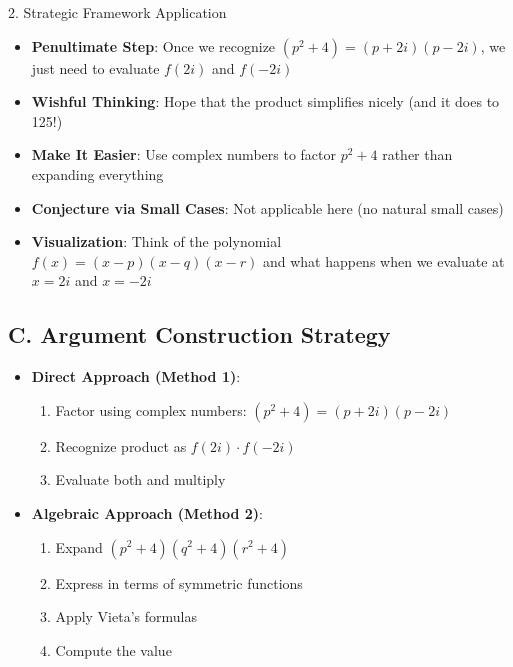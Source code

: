 \documentclass[12pt]{article}
\begin{document}
\begin{strategybox}{2. Strategic Framework Application}
\begin{itemize}[leftmargin=*]
    \item \textbf{Penultimate Step}: Once we recognize $(p^2 + 4) = (p + 2i)(p - 2i)$, we just need to evaluate $f(2i)$ and $f(-2i)$
    
    \item \textbf{Wishful Thinking}: Hope that the product simplifies nicely (and it does to 125!)
    
    \item \textbf{Make It Easier}: Use complex numbers to factor $p^2 + 4$ rather than expanding everything
    
    \item \textbf{Conjecture via Small Cases}: Not applicable here (no natural small cases)
    
    \item \textbf{Visualization}: Think of the polynomial $f(x) = (x - p)(x - q)(x - r)$ and what happens when we evaluate at $x = 2i$ and $x = -2i$
\end{itemize}

\subsection*{C. Argument Construction Strategy}
\begin{itemize}[leftmargin=*]
    \item \textbf{Direct Approach (Method 1)}: 
    \begin{enumerate}
        \item Factor using complex numbers: $(p^2 + 4) = (p + 2i)(p - 2i)$
        \item Recognize product as $f(2i) \cdot f(-2i)$
        \item Evaluate both and multiply
    \end{enumerate}
    
    \item \textbf{Algebraic Approach (Method 2)}:
    \begin{enumerate}
        \item Expand $(p^2 + 4)(q^2 + 4)(r^2 + 4)$
        \item Express in terms of symmetric functions
        \item Apply Vieta's formulas
        \item Compute the value
    \end{enumerate}
\end{itemize}

\end{strategybox}
\end{document}
